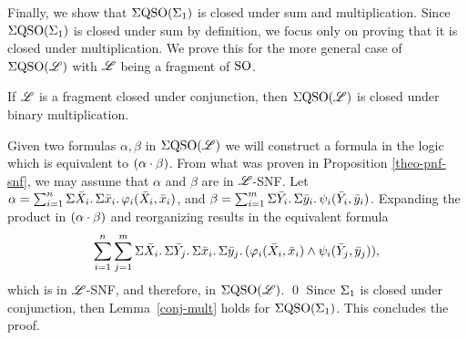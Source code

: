 Finally, we show that $\Sigma{\rm QSO}(\Sigma_{1})$ is closed under sum and multiplication. 
Since $\Sigma{\rm QSO}(\Sigma_{1})$ is closed under sum by definition, we focus only on proving that it is closed under multiplication. 
We prove this for the more general case of $\Sigma{\rm QSO}(\mathscr{L})$ with $\mathscr{L}$ being a fragment of ${\rm SO}$.

\begin{lem} \label{conj-mult}
	If $\mathscr{L}$ is a fragment closed under conjunction, then $\Sigma{\rm QSO}(\mathscr{L})$ is closed under binary multiplication.
\end{lem}
\proof
	Given two formulas $\alpha, \beta$ in $\Sigma{\rm QSO}(\mathscr{L})$ we will construct a formula in the logic which is equivalent to $(\alpha\cdot \beta)$. 
	From what was proven in Proposition \ref{theo-pnf-snf}, we may assume that $\alpha$ and $\beta$ are in $\mathscr{L}$-SNF. 
	Let $\alpha = \sum_{i = 1}^n\Sigma{\bar{X}_i}.\,\Sigma{\bar{x}_i}.\,\varphi_i(\bar{X}_i,\bar{x}_i)$, and $\beta = \sum_{i = 1}^m\Sigma{\bar{Y}_i}.\,\Sigma{\bar{y}_i}.\,\psi_i(\bar{Y}_i,\bar{y}_i)$. Expanding the product in $(\alpha\cdot \beta)$ and reorganizing results in the equivalent formula
	$$
	\sum_{i = 1}^n\sum_{j = 1}^m\Sigma{\bar{X}_i}.\,\Sigma{\bar{Y}_j}.\,\Sigma{\bar{x}_i}.\,\Sigma{\bar{y}_j}.\,(\varphi_i(\bar{X}_i,\bar{x}_i)\wedge\psi_i(\bar{Y}_j,\bar{y}_j)),
	$$
	which is in $\mathscr{L}$-SNF, and therefore, in $\Sigma{\rm QSO}(\mathscr{L})$.
\qed
Since $\Sigma_{1}$ is closed under conjunction, then Lemma~\ref{conj-mult} holds for $\Sigma{\rm QSO}(\Sigma_{1})$. 
This concludes the proof.
